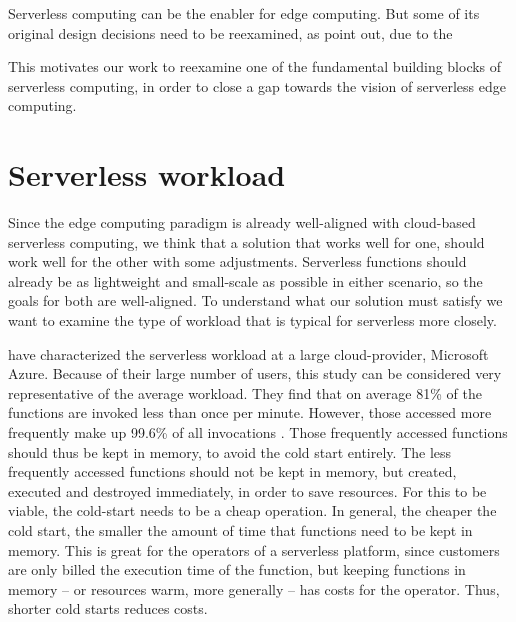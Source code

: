 Serverless computing can be the enabler for edge computing. But some of its original design decisions need to be reexamined, as \citeauthor{Nastic2018} point out, due to the

\begin{quote}
\end{quote}

This motivates our work to reexamine one of the fundamental building blocks of serverless computing, in order to close a gap towards the vision of serverless edge computing.

\section{Serverless workload}

Since the edge computing paradigm is already well-aligned with cloud-based serverless computing, we think that a solution that works well for one, should work well for the other with some adjustments. Serverless functions should already be as lightweight and small-scale as possible in either scenario, so the goals for both are well-aligned.
To understand what our solution must satisfy we want to examine the type of workload that is typical for serverless more closely.

\citeauthor{Shahrad2020} have characterized the serverless workload at a large cloud-provider, Microsoft Azure. Because of their large number of users, this study can be considered very representative of the average workload.
They find that on average 81\% of the functions are invoked less than once per minute. However, those accessed more frequently make up 99.6\% of all invocations \cite{Shahrad2020}.
Those frequently accessed functions should thus be kept in memory, to avoid the cold start entirely. The less frequently accessed functions should not be kept in memory, but created, executed and destroyed immediately, in order to save resources. For this to be viable, the cold-start needs to be a cheap operation. In general, the cheaper the cold start, the smaller the amount of time that functions need to be kept in memory. This is great for the operators of a serverless platform, since customers are only billed the execution time of the function, but keeping functions in memory -- or resources warm, more generally -- has costs for the operator. Thus, shorter cold starts reduces costs.

